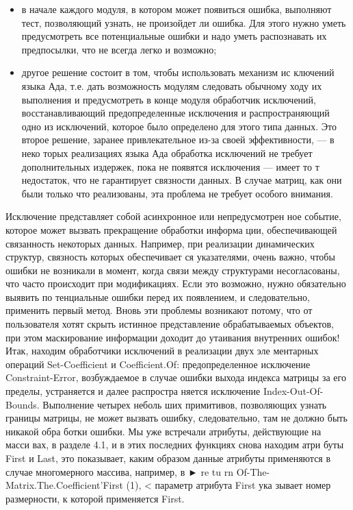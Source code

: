 \documentclass{../../template/mai_book}
\begin{document}
\begin{itemize}  
\item в начале каждого модуля, в котором может появиться ошибка,
выполняют тест, позволяющий узнать, не произойдет ли ошибка.
Для этого нужно уметь предусмотреть все потенциальные ошибки
и надо уметь распознавать их предпосылки, что не всегда легко
и возможно;
\item другое решение состоит в том, чтобы использовать механизм ис­
ключений языка Ада, т.е. дать возможность модулям следовать
\newpage
обычному ходу их выполнения и предусмотреть в конце модуля
обработчик исключений, восстанавливающий предопределенные
исключения и распространяющий одно из исключений, которое
было определено для этого типа данных. Это второе решение,
заранее привлекательное из-за своей эффективности, — в неко­
торых реализациях языка Ада обработка исключений не требует
дополнительных издержек, пока не появятся исключения — имеет
то т недостаток, что не гарантирует связности данных. В случае
матриц, как они были только что реализованы, эта проблема не
требует особого внимания.
\end{itemize}

Исключение представляет собой асинхронное или непредусмотрен­
ное событие, которое может вызвать прекращение обработки информа­
ции, обеспечивающей связанность некоторых данных. Например, при
реализации динамических структур, связность которых обеспечивает­
ся указателями, очень важно, чтобы ошибки не возникали в момент,
когда связи между структурами несогласованы, что часто происходит
при модификациях. Если это возможно, нужно обязательно выявить по­
тенциальные ошибки перед их появлением, и следовательно, применить
первый метод.
Вновь эти проблемы возникают потому, что от пользователя хотят
скрыть истинное представление обрабатываемых объектов, при этом
маскирование информации доходит до утаивания внутренних ошибок!
Итак, находим обработчики исключений в реализации двух эле­
ментарных операций Set-Coefficient и Coefficient.Of: предопределенное
исключение Constraint-Error, возбуждаемое в случае ошибки выхода
индекса матрицы за его пределы, устраняется и далее распростра­
няется исключение Index-Out-Of-Bounds. Выполнение четырех неболь­
ших примитивов, позволяющих узнать границы матрицы, не может
вызвать ошибку, следовательно, там не должно быть никакой обра­
ботки ошибки. Мы уже встречали атрибуты, действующие на масси­
вах, в разделе 4.1, и в этих последних функциях снова находим атри­
буты First и Last, это показывает, каким образом данные атрибуты
применяются в случае многомерного массива, например, в ► re tu rn
Of-The-Matrix.The.Coefficient’First (1), < параметр атрибута First ука­
зывает номер размерности, к которой применяется First.
\end{document}
